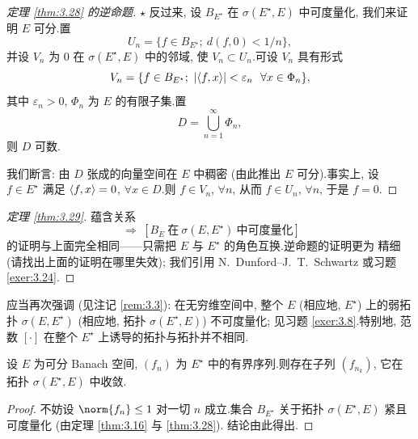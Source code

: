 \begin{proof}[定理 \ref{thm:3.28} 的逆命题]
$\star$ 反过来, 设 $B_{E^\star}$ 在 $\sigma(E^\star,E)$ 中可度量化, 我们来证明
$E$ 可分.置
\begin{equation*}
U_n=\{f\in B_{E^\star};\ d(f,0)<1/n\},
\end{equation*}
并设 $V_n$ 为 $0$ 在 $\sigma(E^\star,E)$ 中的邻域, 使 $V_n\subset U_n$.可设 $V_n$
具有形式
\begin{equation*}
V_n=\{f\in B_{E^\star};\ \abs{\dual{f}{x}}<\varepsilon_n\ \ \forall x\in\Phi_n\},
\end{equation*}
其中 $\varepsilon_n>0$, $\Phi_n$ 为 $E$ 的有限子集.置
\begin{equation*}
D=\bigcup_{n=1}^\infty\Phi_n,
\end{equation*}
则 $D$ 可数.

我们断言: 由 $D$ 张成的向量空间在 $E$ 中稠密 (由此推出 $E$ 可分).事实上, 设
$f\in E^\star$ 满足 $\left\langle f,x\right\rangle=0$, $\forall x\in D$.则 $f\in V_n$,
$\forall n$, 从而 $f\in U_n$, $\forall n$, 于是 $f=0$.
\end{proof}

\begin{proof}[定理 \ref{thm:3.29}]
蕴含关系
\begin{equation*}
[E^\star\ \text{可分}]\ \Rightarrow\ [B_E\ \text{在}\ \sigma(E,E^\star)\ \text{中可度量化}]
\end{equation*}
的证明与上面完全相同——只需把 $E$ 与 $E^\star$ 的角色互换.逆命题的证明更为
精细 (请找出上面的证明在哪里失效); 我们引用 N.~Dunford--J.~T.~Schwartz
 或习题  \ref{exer:3.24}.
\end{proof}

\begin{remark}
\label{rem:3.20}
应当再次强调 (见注记 \ref{rem:3.3}): 在无穷维空间中, 整个 $E$ (相应地,
$E^\star$) 上的弱拓扑 $\sigma(E,E^\star)$ (相应地, \wstar{}拓扑
$\sigma(E^\star,E)$) 不可度量化; 见习题  \ref{exer:3.8}.特别地, 范数
$[\cdot]$ 在整个 $E^\star$ 上诱导的拓扑与\wstar{}拓扑并不相同.
\end{remark}

\begin{corollary}
\label{cor:3.30}
设 $E$ 为可分 Banach 空间, $(f_n)$ 为 $E^\star$ 中的有界序列.则存在子列
$(f_{n_k})$, 它在\wstar{}拓扑 $\sigma(E^\star,E)$ 中收敛.
\end{corollary}

\begin{proof}
不妨设 $\norm{f_n}\le1$ 对一切 $n$ 成立.集合 $B_{E^\star}$ 关于拓扑
$\sigma(E^\star,E)$ 紧且可度量化 (由定理  \ref{thm:3.16} 与  \ref{thm:3.28}).
结论由此得出.
\end{proof}

